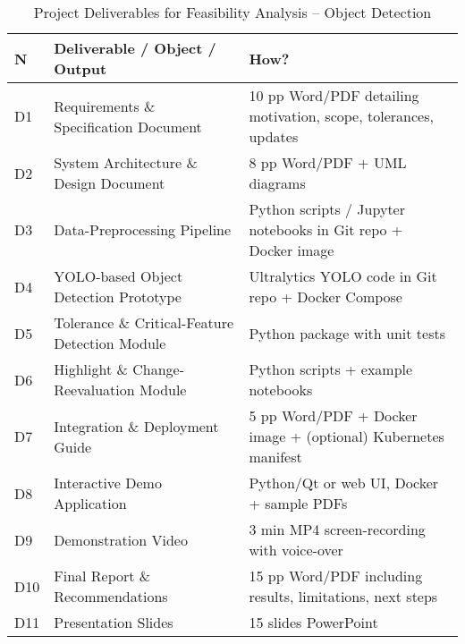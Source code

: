 \documentclass{article}
\begin{document}
\begin{table}[ht]
    \centering
    \caption{Project Deliverables for Feasibility Analysis – Object Detection}
    \begin{tabular}{p{1cm} p{7cm} p{6cm}}
    \toprule
    \textbf{N} & \textbf{Deliverable / Object / Output} & \textbf{How?} \\
    \midrule
    D1 & Requirements \& Specification Document
       & \textapprox{}10 pp Word/PDF detailing motivation, scope, tolerances, updates \\[4pt]
    D2 & System Architecture \& Design Document
       & \textapprox{}8 pp Word/PDF + UML diagrams \\[4pt]
    D3 & Data-Preprocessing Pipeline
       & Python scripts / Jupyter notebooks in Git repo + Docker image \\[4pt]
    D4 & YOLO-based Object Detection Prototype
       & Ultralytics YOLO code in Git repo + Docker Compose \\[4pt]
    D5 & Tolerance \& Critical-Feature Detection Module
       & Python package with unit tests \\[4pt]
    D6 & Highlight \& Change-Reevaluation Module
       & Python scripts + example notebooks \\[4pt]
    D7 & Integration \& Deployment Guide
       & \textapprox{}5 pp Word/PDF + Docker image + (optional) Kubernetes manifest \\[4pt]
    D8 & Interactive Demo Application
       & Python/Qt or web UI, Docker + sample PDFs \\[4pt]
    D9 & Demonstration Video
       & \textapprox{}3 min MP4 screen-recording with voice-over \\[4pt]
    D10 & Final Report \& Recommendations
        & \textapprox{}15 pp Word/PDF including results, limitations, next steps \\[4pt]
    D11 & Presentation Slides
        & \textapprox{}15 slides PowerPoint \\
    \bottomrule
    \end{tabular}
\end{table}
\end{document}

